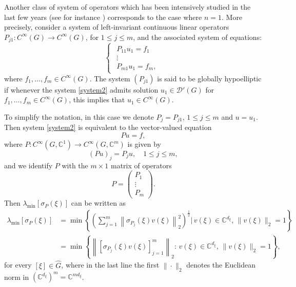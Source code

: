 \documentclass[11pt]{amsart}
\numberwithin{theorem}{section}
\numberwithin{equation}{section}
\theoremstyle{definition}
\numberwithin{example}{section}
\theoremstyle{definition}
\theoremstyle{definition}
\newcommand{\C}{\mathbb{C}}
\begin{document}
 Another class of system of operators which has been intensively studied in the last few years (see for instance \cite{BergamascoGH,systems-gelfand,overdetermined,gevrey-torus,stronglyinvariantsyst}) corresponds to the case where $n=1$. More precisely, consider a system of left-invariant continuous linear operators $P_{j1}:C^\infty(G)\to C^\infty(G)$, for $1\leq j\leq m$, and the associated system of equations:
\begin{equation}\label{system2}
    \begin{cases}
        \begin{matrix}
    P_{11}u_1=f_1\\
    \vdots\\
    P_{m1}u_1=f_m,
\end{matrix}
    \end{cases}
\end{equation}
where $f_1,\dots, f_m\in C^\infty(G)$. The system $(P_{j1})$ is said to be globally hypoelliptic if whenever the system \eqref{system2} admits solution $u_1\in\mathcal{D}'(G)$ for $f_1,\dots, f_m\in C^\infty(G)$, this implies that $u_1\in C^\infty(G)$.

To simplify the notation, in this case we denote $P_j= P_{j1}$, $1\leq j\leq m$ and $u= u_1$. 
Then system \eqref{system2} is equivalent to  the vector-valued equation
\begin{equation*}
    Pu=f,
\end{equation*}
where $P: C^\infty(G,\mathbb{C}^1)\to C^\infty(G,\mathbb{C}^m)$ is given by
\begin{equation}\label{eq_operator_P2}
    (Pu)_j=P_{j}u,\quad 1\leq j\leq m,
\end{equation} 
and we identify $P$ with the $m\times 1$ matrix of operators
\begin{equation*}
    P=\begin{pmatrix}
        P_1\\
        \vdots\\
        P_{m}
    \end{pmatrix}.
\end{equation*}
Then $\lambda_{\min}[\sigma_P(\xi)]$  can be written as 
\begin{align*}
      \lambda_{\min}[\sigma_P(\xi)]&= \min\left\{\left(\sum_{j=1}^{m}\left\|
         \sigma_{P_{j}}(\xi)v(\xi)\right\|_{2}^2\right)^{\frac{1}{2}}\bigg|\,v(\xi)\in \mathbb{C}^{d_\xi},\,\|v(\xi)\|_2=1\right\}\\
         &=\min\left\{\left\|
         [\sigma_{P_{j}}(\xi)v(\xi)]_{j=1}^m\right\|_{2} : \,v(\xi)\in \mathbb{C}^{d_\xi},\,\|v(\xi)\|_2=1\right\},
    \end{align*}
    for every $[\xi]\in\widehat{G}$, where in the last line the first $\|\cdot\|_2$ denotes the Euclidean norm in $(\mathbb{C}^{d_\xi})^m=\C^{md_\xi}$. 
\end{document}
